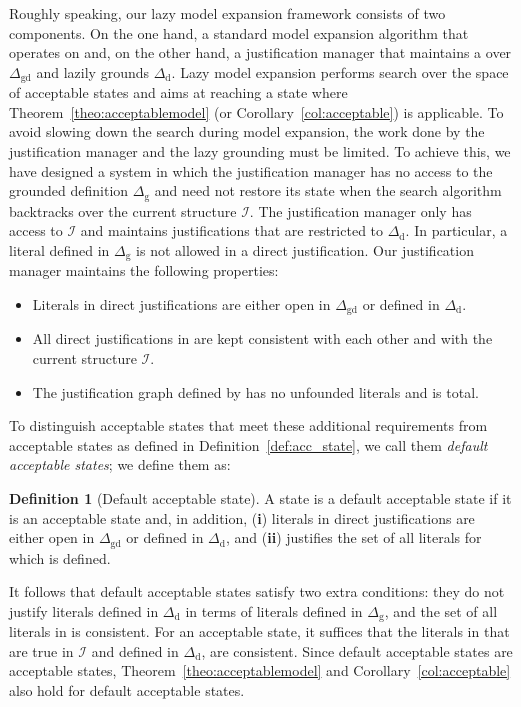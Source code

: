 \documentclass[11pt]{article}
\newcommand{\m}[1]{\ensuremath{#1}\xspace}
\newcommand{\I}{\m{\mathcal{I}}}
\newcommand{\D}{\m{\Delta}}
\theoremstyle{plain}
\theoremstyle{definition}
\newtheorem{definition}[thm]{Definition}
\theoremstyle{example_basic}
\theoremstyle{example_contd}
\theoremstyle{plain}
\newcommand{\Dg}{\ensuremath{\D_\text{g}}\xspace}
\newcommand{\Dd}{\ensuremath{\D_\text{d}}\xspace}
\newcommand{\Dgd}{\ensuremath{\D_\text{gd}}\xspace}
\newcommand{\tbf}[1]{\textbf{#1}}
\newcommand{\change}[1]{#1}
\begin{document}
Roughly speaking, our lazy model expansion framework consists of two components. On the one hand, a standard model expansion algorithm that operates on  and, on the other hand, a justification manager that maintains a \justification over \Dgd and lazily grounds \Dd. Lazy model expansion performs search over the space of acceptable states and aims at reaching a state where Theorem~\ref{theo:acceptablemodel} (or Corollary~\ref{col:acceptable}) is applicable. To avoid slowing down the search during model expansion, the work done by the justification manager and the lazy grounding must be limited. To achieve this, we have designed a system in which the justification manager has no access to the grounded definition \Dg and need not restore its state when the search algorithm backtracks over the current structure \I.  The justification manager only has access to \I and maintains justifications that are restricted to \Dd. In particular, a literal defined in \Dg is not allowed in a direct justification. Our justification manager maintains the following properties: 
\begin{itemize}
\item Literals in direct justifications are either open in \Dgd or defined in \Dd.
\item All direct justifications in \jgraph are kept consistent with each other and with the current structure \I.
\item The justification graph defined by \jgraph has no \change{unfounded literals} and is total.
\end{itemize}

To distinguish acceptable states that meet these additional
requirements from acceptable states as defined in
Definition~\ref{def:acc_state}, we call them 
\emph{default acceptable states}; we define them as:

\begin{definition}[Default acceptable state]\label{def:default_acc_state}
A state  is a default acceptable state if it is an acceptable state and, in addition,
(\tbf{i}) literals in direct justifications are either open in \Dgd or defined in \Dd, and  (\tbf{ii}) \jgraph justifies the set of all literals for which  is defined. \end{definition}
It follows that default acceptable states satisfy two extra conditions: they do not justify 
literals defined in \Dd in terms of literals defined in \Dg, and the set of all literals in \jgraph is consistent. \change{For an acceptable state, it suffices that the literals in \jgraph that are true in \I and defined in \Dd, are consistent.}
Since default acceptable states are acceptable states, Theorem~\ref{theo:acceptablemodel} and Corollary~\ref{col:acceptable} also hold for default acceptable states.
 
\end{document}
